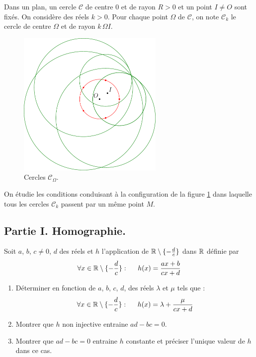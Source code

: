 Dans un plan, un cercle $\mathcal{C}$ de centre $0$ et de rayon $R>0$ et un point $I\neq O$ sont fixés. On considère des réels $k>0$. Pour chaque point $\Omega$ de $\mathcal C$, on note $\mathcal{C}_k$ le cercle de centre $\Omega$ et de rayon $k\,\Omega I$.\\
\begin{figure}[h!]
 \centering
 \includegraphics[width=7cm]{./Eintcerc_1.pdf}
 \caption{Cercles $\mathcal{C}_\Omega$.}
 \label{fig:Eintcerc_1}
\end{figure}
On étudie les conditions conduisant à la configuration de la figure \ref{fig:Eintcerc_1} dans laquelle tous les cercles $\mathcal{C}_k$ passent par un même point $M$.
\subsection*{Partie I. Homographie.}
Soit $a$, $b$, $c\neq 0$, $d$ des réels et $h$ l'application de $\mathbb{R} \setminus\{-\frac{d}{c}\}$ dans $\mathbb{R}$ définie par
\begin{displaymath}
 \forall x \in \mathbb{R} \setminus\{-\frac{d}{c}\}:\hspace{0.5cm}
h(x)=\frac{ax+b}{cx+d}
\end{displaymath}
\begin{enumerate}
\item Déterminer en fonction de $a$, $b$, $c$, $d$, des réels $\lambda$ et $\mu$ tels que :
\begin{displaymath}
 \forall x \in \mathbb{R} \setminus\{-\frac{d}{c}\}:\hspace{0.5cm}
h(x)= \lambda + \frac{\mu}{cx+d}
\end{displaymath}
 \item Montrer que $h$ non injective entraine $ad-bc=0$.
 \item Montrer que $ad-bc=0$ entraine $h$ constante et préciser l'unique valeur de $h$ dans ce cas.
\end{enumerate}

